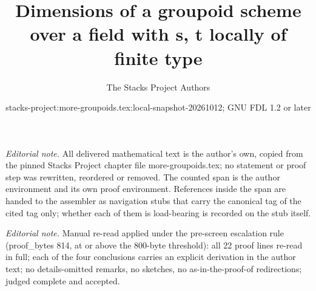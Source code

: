 \documentclass{stacks-project}
\title{Dimensions of a groupoid scheme over a field with s, t locally of finite type}
\author{The Stacks Project Authors}
\date{stacks-project:more-groupoids.tex:local-snapshot-20261012; GNU FDL 1.2 or later}
\theoremstyle{plain}
\theoremstyle{definition}
\theoremstyle{remark}
\numberwithin{equation}{subsection}
\begin{document}
\maketitle
\setcounter{subsection}{1}
\noindent\textit{Editorial note.} All delivered mathematical text is the author's own, copied from the pinned Stacks Project chapter file more-groupoids.tex; no statement or proof step was rewritten, reordered or removed. The counted span is the author environment and its own proof environment. References inside the span are handed to the assembler as navigation stubs that carry the canonical tag of the cited tag only; whether each of them is load-bearing is recorded on the stub itself.\par\medskip
\noindent\textit{Editorial note.} Manual re-read applied under the pre-screen escalation rule (proof\_bytes 814, at or above the 800-byte threshold): all 22 proof lines re-read in full; each of the four conclusions carries an explicit derivation in the author text; no details-omitted remarks, no sketches, no as-in-the-proof-of redirections; judged complete and accepted.\par\medskip
\end{document}
